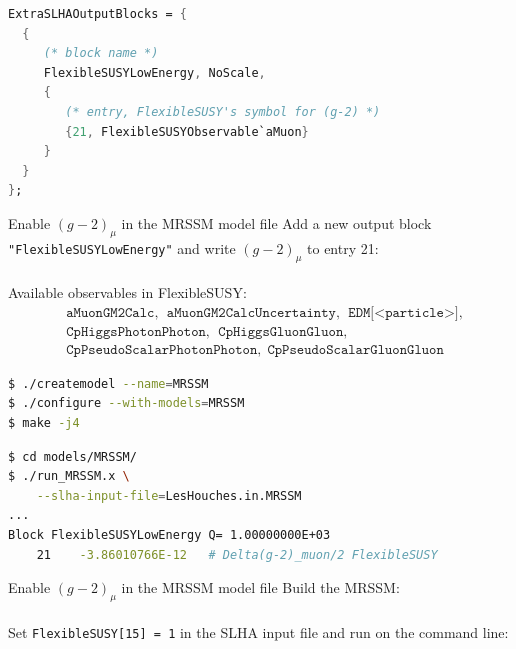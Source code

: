 \documentclass[hyperref={pdfpagelabels=false},ngerman]{beamer}
\begin{document}
\begin{lrbox}{\listbox}\begin{lstlisting}[language=Mathematica]
ExtraSLHAOutputBlocks = {
  {
     (* block name *)
     FlexibleSUSYLowEnergy, NoScale,
     {
        (* entry, FlexibleSUSY's symbol for (g-2) *)
        {21, FlexibleSUSYObservable`aMuon}
     }
  }
};
\end{lstlisting}\end{lrbox} %

\begin{frame}{Enable $(g-2)_\mu$ in the MRSSM model file}
  Add a new output block \texttt{"FlexibleSUSYLowEnergy"} and write
  $(g-2)_\mu$ to entry 21:
  \\[2em]
  \usebox{\listbox}
  \\[1em]
  Available observables in FlexibleSUSY:
  \begin{align*}
    &\texttt{aMuonGM2Calc},\ \ \texttt{aMuonGM2CalcUncertainty},\ \ \texttt{EDM[<particle>]},\\
    &\texttt{CpHiggsPhotonPhoton},\ \ \texttt{CpHiggsGluonGluon},\\
    &\texttt{CpPseudoScalarPhotonPhoton},\ \ \texttt{CpPseudoScalarGluonGluon}
  \end{align*}
\end{frame}

\begin{lrbox}{\listbox}\begin{lstlisting}[language=bash]
$ ./createmodel --name=MRSSM
$ ./configure --with-models=MRSSM
$ make -j4
\end{lstlisting}\end{lrbox} %

\begin{lrbox}{\listboxt}\begin{lstlisting}[language=bash]
$ cd models/MRSSM/
$ ./run_MRSSM.x \
    --slha-input-file=LesHouches.in.MRSSM
...
Block FlexibleSUSYLowEnergy Q= 1.00000000E+03
    21    -3.86010766E-12   # Delta(g-2)_muon/2 FlexibleSUSY
\end{lstlisting}\end{lrbox} %

\begin{frame}{Enable $(g-2)_\mu$ in the MRSSM model file}
  Build the MRSSM:\\[1.5em]
  \usebox{\listbox}
  \\[1em]
  Set \texttt{FlexibleSUSY[15] = 1} in the SLHA input file and run on
  the command line:
  \\[1.5em]
  \usebox{\listboxt}
\end{frame}
\end{document}
